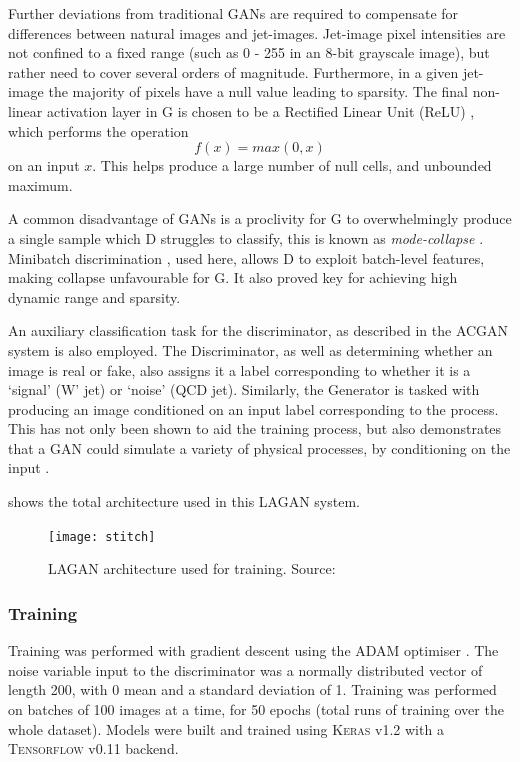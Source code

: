 \documentclass[twocolumn]{article}
\newcommand{\pkg}[1]{\textsc{#1}}
\begin{document}
Further deviations from traditional GANs are required to compensate for differences between natural images and jet-images. Jet-image pixel intensities are not confined to a fixed range (such as 0 - 255 in an 8-bit grayscale image), but rather need to cover several orders of magnitude. Furthermore, in a given jet-image the majority of pixels have a null value leading to sparsity. The final non-linear activation layer in G is chosen to be a Rectified Linear Unit (ReLU) \cite{relu}, which performs the operation
$$
f(x) = max(0, x)
$$
on an input $x$. This helps produce a large number of null cells, and unbounded maximum. 

A common disadvantage of GANs is a proclivity for G to overwhelmingly produce a single sample which D struggles to classify, this is known as \textit{mode-collapse} \cite{gan1}. Minibatch discrimination \cite{improvedgan}, used here, allows D to exploit batch-level features, making collapse unfavourable for G. It also proved key for achieving high dynamic range and sparsity.

An auxiliary classification task for the discriminator, as described in the ACGAN system \cite{odena2016conditional} is also employed. The Discriminator, as well as determining whether an image is real or fake, also assigns it a label corresponding to whether it is a `signal' (W' jet) or `noise' (QCD jet). Similarly, the Generator is tasked with producing an image conditioned on an input label corresponding to the process. This has not only been shown to aid the training process, but also demonstrates that a GAN could simulate a variety of physical processes, by conditioning on the input \cite{mirza2014conditional}.

 shows the total architecture used in this LAGAN system. 
\begin{figure}[!htbp]
	\centering
	\texttt{[image: stitch]}
	
	\caption{LAGAN architecture used for training. Source: \cite{de2017learning}}
	\label{fig:stitch}
	
\end{figure}   

\subsubsection{Training}
\label{sec:training}
Training was performed with gradient descent using the ADAM optimiser \cite{adam}. The noise variable input to the discriminator was a normally distributed vector of length 200, with 0 mean and a standard deviation of 1. Training was performed on batches of 100 images at a time, for 50 epochs (total runs of training over the whole dataset). Models were built and trained using \pkg{Keras} v1.2 \cite{keras} with a \pkg{Tensorflow} v0.11 \cite{tensorflow} backend.
\end{document}
